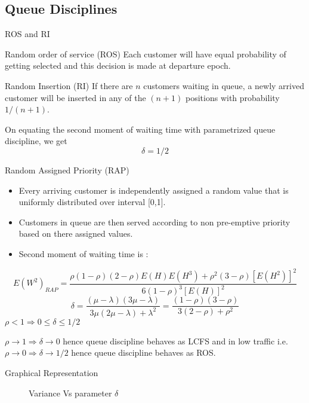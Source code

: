 \documentclass[compress, serif, onlymath, professionalfonts]{beamer}
\begin{document}
\subsection{Queue Disciplines}
\begin{frame}{ROS and RI}
\begin{block}{Random order of service (ROS)}
Each customer will have equal probability of getting selected and this decision is made at departure epoch.
\end{block}
\begin{block}{Random Insertion (RI)}
If there are $n$ customers waiting in queue, a newly arrived customer
will be inserted in any of the $(n+1)$ positions with probability $1/(n+1)$.
\end{block}
On equating the second moment of waiting time with parametrized queue discipline, we get 
$$\delta =1/2$$ 
\end{frame}
\begin{frame}{Random Assigned Priority (RAP)}
\begin{itemize}
\item Every arriving customer is independently assigned a random value
that is uniformly distributed over interval [0,1].
\item Customers in queue are then served according to non
pre-emptive priority based on there assigned values.
\item Second moment of waiting time is \citep{Questa_comparision}:
\end{itemize}
$$E(W^2)_{RAP} = \dfrac{\rho(1-\rho)(2-\rho)E(H)E(H^3)+ \rho^2(3-\rho)[E(H^2)]^2}{6(1-\rho)^3[E(H)]^2}$$
$$\delta = \dfrac{(\mu-\lambda)(3\mu-\lambda)}{3\mu(2\mu-\lambda)+\lambda^2} = \dfrac{(1-\rho)(3-\rho)}{3(2-\rho)+\rho^2}$$
$\rho < 1 \Rightarrow 0\le \delta\le 1/2$
\begin{block}{}
$\rho \rightarrow 1 \Rightarrow \delta \rightarrow 0$ hence queue discipline behaves as LCFS and in low traffic i.e.$\rho \rightarrow 0 \Rightarrow \delta \rightarrow 1/2$ hence queue discipline behaves as ROS.
\end{block}
\end{frame}
\begin{frame}{Graphical Representation}
\begin{figure}[htb!]
\centering
\resizebox{0.59 \textwidth}{!}{}
\caption{Variance Vs parameter $\delta$}
\end{figure}
\end{frame}
\end{document}
